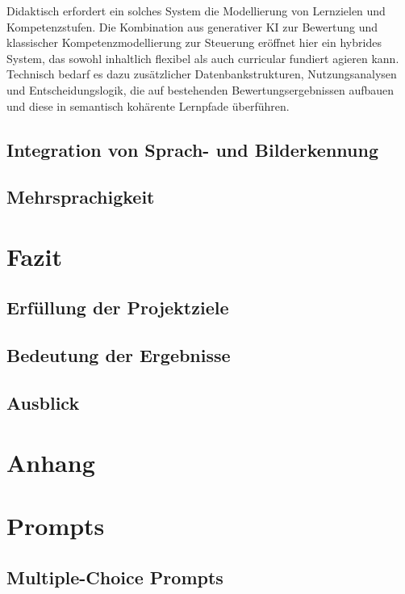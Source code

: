\documentclass[a4paper,12pt]{article}
\begin{document}
Didaktisch erfordert ein solches System die Modellierung von Lernzielen und Kompetenzstufen. Die Kombination aus generativer KI zur Bewertung und klassischer Kompetenzmodellierung zur Steuerung eröffnet hier ein hybrides System, das sowohl inhaltlich flexibel als auch curricular fundiert agieren kann. Technisch bedarf es dazu zusätzlicher Datenbankstrukturen, Nutzungsanalysen und Entscheidungslogik, die auf bestehenden Bewertungsergebnissen aufbauen und diese in semantisch kohärente Lernpfade überführen.

\subsection{Integration von Sprach- und Bilderkennung}


\subsection{Mehrsprachigkeit}

\newpage

\section{Fazit}
\subsection{Erfüllung der Projektziele}
\subsection{Bedeutung der Ergebnisse}
\subsection{Ausblick}


\newpage

\section{Anhang}
\label{anhang}
\appendix


\section{Prompts}

\subsection{Multiple-Choice Prompts}
\end{document}
